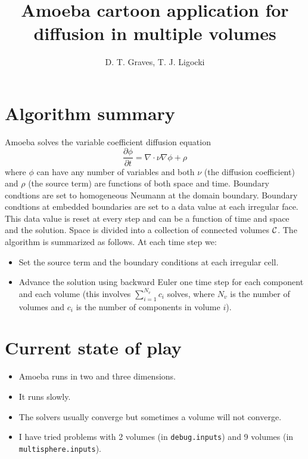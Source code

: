 \documentclass[12pt]{article}
\title{Amoeba cartoon application for diffusion in multiple volumes}
\author{D. T. Graves, T. J. Ligocki}
\begin{document}
\maketitle

\section{Algorithm summary}

Amoeba solves the variable coefficient diffusion equation
$$
\frac{\partial \phi}{\partial t} = \nabla \cdot \nu \nabla \phi + \rho
$$
where $\phi$ can have any number of variables and both $\nu$ (the diffusion
coefficient) and $\rho$ (the source term) are functions of both space
and time.   Boundary condtions are set to homogeneous Neumann at the
domain boundary.   Boundary condtions at embedded boundaries are set
to a data value at each irregular face.   This data value is reset at
every step and can be a function of time and space and the solution. 
Space is divided into a collection of connected volumes
${\cal C}$.   The algorithm is summarized as follows.  At each time
step we:
\begin{itemize}
\item Set the source term and the boundary conditions at each
  irregular cell.
\item Advance the solution using backward Euler one time step for each
  component and each volume (this involves $\sum_{i=1}^{N_v} c_i$ solves,
  where $N_v$ is the number of volumes and $c_i$ is the number of components
  in volume $i$).
\end{itemize}

\section{Current state of play}
\begin{itemize}
\item Amoeba runs in two and three dimensions. 
\item It runs slowly.
\item The solvers usually converge but sometimes a volume will not
  converge.
\item I have tried problems with 2 volumes (in {\tt debug.inputs}) and
9 volumes (in {\tt multisphere.inputs}).
\end{itemize}
\end{document}
